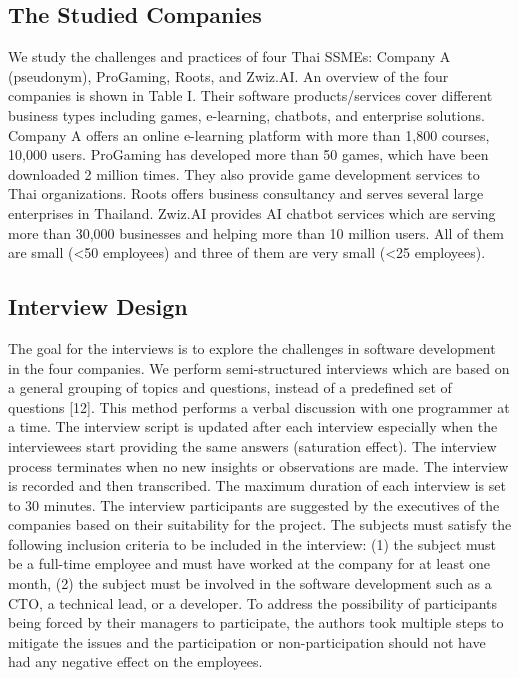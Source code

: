 \documentclass[conference]{IEEEtran}
\begin{document}
\subsection{The Studied Companies}
We study the challenges and practices of four Thai SSMEs:
Company A (pseudonym), ProGaming, Roots, and Zwiz.AI.
An overview of the four companies is shown in Table I.
Their software products/services cover different business types
including games, e-learning, chatbots, and enterprise solutions.
Company A offers an online e-learning platform with more
than 1,800 courses, 10,000 users. ProGaming has developed more than 50 games, which
have been downloaded 2 million times. They also provide
game development services to Thai organizations. Roots offers
business consultancy and serves several large enterprises in
Thailand. Zwiz.AI provides AI chatbot services which are
serving more than 30,000 businesses and helping more than
10 million users. All of them are small (<50 employees) and
three of them are very small (<25 employees).

\subsection{Interview Design}\label{AA}
The goal for the interviews is to explore the challenges
in software development in the four companies. We perform
semi-structured interviews which are based on a general
grouping of topics and questions, instead of a predefined set
of questions [12]. This method performs a verbal discussion
with one programmer at a time. The interview script is updated
after each interview especially when the interviewees start
providing the same answers (saturation effect). The interview
process terminates when no new insights or observations are
made. The interview is recorded and then transcribed. The
maximum duration of each interview is set to 30 minutes.
The interview participants are suggested by the executives
of the companies based on their suitability for the project.
The subjects must satisfy the following inclusion criteria to be
included in the interview: (1) the subject must be a full-time
employee and must have worked at the company for at least
one month, (2) the subject must be involved in the software
development such as a CTO, a technical lead, or a developer.
To address the possibility of participants being forced by
their managers to participate, the authors took multiple steps
to mitigate the issues and the participation or non-participation
should not have had any negative effect on the employees.
\end{document}
